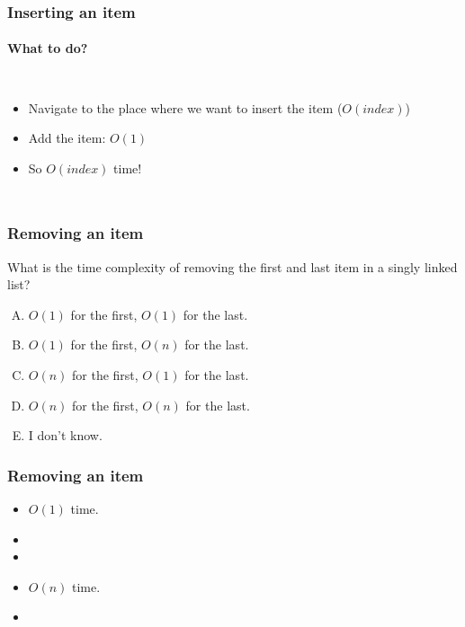 \begin{frame}
	\frametitle{Inserting an item}
	\framesubtitle{What to do?}
	\begin{columns}
	\begin{itemize}
		\item Navigate to the place where we want to insert the item ($O(\textit{index})$)
			
		\item Add the item: $O(1)$
			
		\item So $O(\textit{index})$ time!
	\end{itemize}
			
		
	
			
	\end{columns}
\end{frame}

\begin{frame}
	\frametitle{Removing an item}

		What is the time complexity of removing the first and last item in a singly linked list?

		\begin{enumerate}[A.]
			\item $O(1)$ for the first, $O(1)$ for the last.
			\item $O(1)$ for the first, $O(n)$ for the last.
			\item $O(n)$ for the first, $O(1)$ for the last.
			\item $O(n)$ for the first, $O(n)$ for the last.
			\item I don't know.
		\end{enumerate}


\end{frame}

\begin{frame}
	\frametitle{Removing an item}


		\begin{itemize}
			\item $O(1)$ time.
			
			\item 

		\item 
		
			\item $O(n)$ time.

			\item 
	\end{itemize}

\end{frame}

